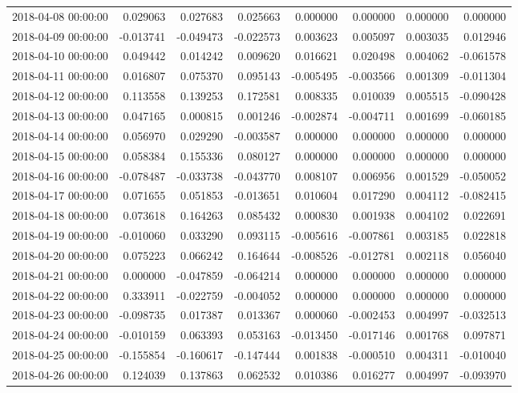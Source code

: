 \begin{tabular}{lrrrrrrr}
2018-04-08 00:00:00 & 0.029063 & 0.027683 & 0.025663 & 0.000000 & 0.000000 & 0.000000 & 0.000000 \\
2018-04-09 00:00:00 & -0.013741 & -0.049473 & -0.022573 & 0.003623 & 0.005097 & 0.003035 & 0.012946 \\
2018-04-10 00:00:00 & 0.049442 & 0.014242 & 0.009620 & 0.016621 & 0.020498 & 0.004062 & -0.061578 \\
2018-04-11 00:00:00 & 0.016807 & 0.075370 & 0.095143 & -0.005495 & -0.003566 & 0.001309 & -0.011304 \\
2018-04-12 00:00:00 & 0.113558 & 0.139253 & 0.172581 & 0.008335 & 0.010039 & 0.005515 & -0.090428 \\
2018-04-13 00:00:00 & 0.047165 & 0.000815 & 0.001246 & -0.002874 & -0.004711 & 0.001699 & -0.060185 \\
2018-04-14 00:00:00 & 0.056970 & 0.029290 & -0.003587 & 0.000000 & 0.000000 & 0.000000 & 0.000000 \\
2018-04-15 00:00:00 & 0.058384 & 0.155336 & 0.080127 & 0.000000 & 0.000000 & 0.000000 & 0.000000 \\
2018-04-16 00:00:00 & -0.078487 & -0.033738 & -0.043770 & 0.008107 & 0.006956 & 0.001529 & -0.050052 \\
2018-04-17 00:00:00 & 0.071655 & 0.051853 & -0.013651 & 0.010604 & 0.017290 & 0.004112 & -0.082415 \\
2018-04-18 00:00:00 & 0.073618 & 0.164263 & 0.085432 & 0.000830 & 0.001938 & 0.004102 & 0.022691 \\
2018-04-19 00:00:00 & -0.010060 & 0.033290 & 0.093115 & -0.005616 & -0.007861 & 0.003185 & 0.022818 \\
2018-04-20 00:00:00 & 0.075223 & 0.066242 & 0.164644 & -0.008526 & -0.012781 & 0.002118 & 0.056040 \\
2018-04-21 00:00:00 & 0.000000 & -0.047859 & -0.064214 & 0.000000 & 0.000000 & 0.000000 & 0.000000 \\
2018-04-22 00:00:00 & 0.333911 & -0.022759 & -0.004052 & 0.000000 & 0.000000 & 0.000000 & 0.000000 \\
2018-04-23 00:00:00 & -0.098735 & 0.017387 & 0.013367 & 0.000060 & -0.002453 & 0.004997 & -0.032513 \\
2018-04-24 00:00:00 & -0.010159 & 0.063393 & 0.053163 & -0.013450 & -0.017146 & 0.001768 & 0.097871 \\
2018-04-25 00:00:00 & -0.155854 & -0.160617 & -0.147444 & 0.001838 & -0.000510 & 0.004311 & -0.010040 \\
2018-04-26 00:00:00 & 0.124039 & 0.137863 & 0.062532 & 0.010386 & 0.016277 & 0.004997 & -0.093970 \\

\end{tabular}
